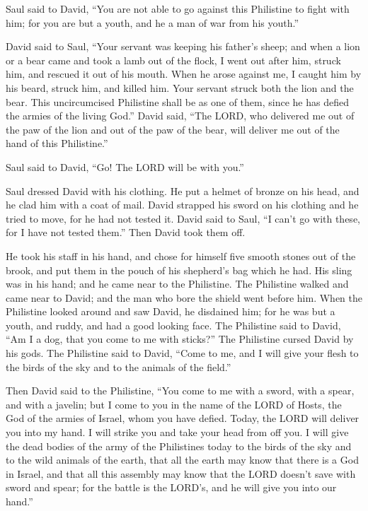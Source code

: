 \myverse{}Saul said to David, “You are not able to go against this Philistine
to fight with him; for you are but a youth, and he a man of war from his youth.”

\myverse{}David said to Saul, “Your servant was keeping his father’s sheep;
and when a lion or a bear came and took a lamb out of the flock,
\myverse{}I went out after him, struck him, and rescued it out of his mouth. When he
arose against me, I caught him by his beard, struck him, and killed him.
\myverse{}Your servant struck both the lion and the bear. This uncircumcised Philistine
shall be as one of them, since he has defied the armies of the living God.”
\myverse{}David said, “The LORD, who delivered me out of the paw of the lion and out
of the paw of the bear, will deliver me out of the hand of this Philistine.”

Saul said to David, “Go! The LORD will be with you.”

\myverse{}Saul dressed David with his clothing. He put a helmet of bronze
on his head, and he clad him with a coat of mail.
\myverse{}David strapped his sword on his clothing and he tried to move, for he had
not tested it. David said to Saul, “I can’t go with these, for I have not tested them.” Then David took
them off.

\myverse{}He took his staff in his hand, and chose for himself five smooth
stones out of the brook, and put them in the pouch of his shepherd’s bag which he had. His sling was in
his hand; and he came near to the Philistine.
\myverse{}The Philistine walked and came near to David; and the man who bore the shield
went before him.
\myverse{}When the Philistine looked around and saw David, he disdained him; for he
was but a youth, and ruddy, and had a good looking face.
\myverse{}The Philistine said to David, “Am I a dog, that you come to me with sticks?”
The Philistine cursed David by his gods.
\myverse{}The Philistine said to David, “Come to me, and I will give your flesh to
the birds of the sky and to the animals of the field.”

\myverse{}Then David said to the Philistine, “You come to me with a sword,
with a spear, and with a javelin; but I come to you in the name of the LORD of Hosts, the God of the armies
of Israel, whom you have defied.
\myverse{}Today, the LORD will deliver you into my hand. I will strike you and take
your head from off you. I will give the dead bodies of the army of the Philistines today to the birds
of the sky and to the wild animals of the earth, that all the earth may know that there is a God in Israel,
\myverse{}and that all this assembly may know that the LORD doesn’t save with sword
and spear; for the battle is the LORD’s, and he will give you into our hand.”

